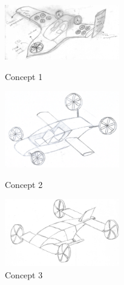 \begin{figure}[H]
  \centering
  \begin{minipage}[b]{0.25\textwidth}
    \includegraphics[width=5.0cm]{./Figures/Concept12a.png}
    \captionsetup{justification=centering}
    \caption{Concept 1}
    \label{1-2A}
  \end{minipage}
  \hspace{1.5cm}
  \begin{minipage}[b]{0.30\textwidth}
    \includegraphics[width=5.0cm]{./Figures/Concept12b.PNG}
    \captionsetup{justification=centering}
    \caption{Concept 2}
    \label{1-2B}
  \end{minipage}
  \hspace{0.5cm}
  \begin{minipage}[b]{0.25\textwidth}
    \includegraphics[width=5.0cm]{./Figures/Concept12c.PNG}
    \captionsetup{justification=centering}
    \caption{Concept 3}
    \label{1-2C}
  \end{minipage}  
\end{figure}


